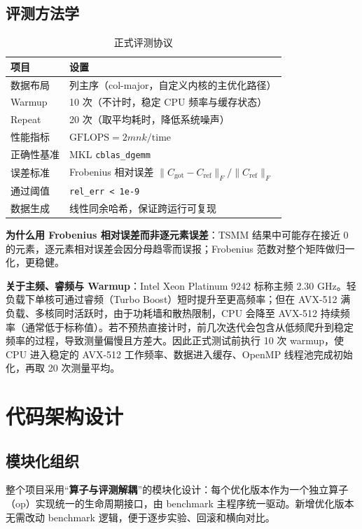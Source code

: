 \documentclass[11pt,a4paper,fontset=fandol]{ctexart}
\begin{document}
\subsection{评测方法学}
\begin{table}[H]
\centering
\caption{正式评测协议}
\small
\begin{tabular}{ll}
\toprule
项目 & 设置 \\
\midrule
数据布局 & 列主序（col-major，自定义内核的主优化路径） \\
Warmup & 10 次（不计时，稳定 CPU 频率与缓存状态） \\
Repeat & 20 次（取平均耗时，降低系统噪声） \\
性能指标 & $\mathrm{GFLOPS} = 2mnk / \mathrm{time}$ \\
正确性基准 & MKL \texttt{cblas\_dgemm} \\
误差标准 & Frobenius 相对误差 $\|C_{\text{got}}-C_{\text{ref}}\|_F / \|C_{\text{ref}}\|_F$ \\
通过阈值 & \texttt{rel\_err < 1e-9} \\
数据生成 & 线性同余哈希，保证跨运行可复现 \\
\bottomrule
\end{tabular}
\end{table}

\textbf{为什么用 Frobenius 相对误差而非逐元素误差}：TSMM 结果中可能存在接近 0 的元素，逐元素相对误差会因分母趋零而误报；Frobenius 范数对整个矩阵做归一化，更稳健。

\textbf{关于主频、睿频与 Warmup}：Intel Xeon Platinum 9242 标称主频 2.30 GHz。轻负载下单核可通过睿频（Turbo Boost）短时提升至更高频率；但在 AVX-512 满负载、多核同时活跃时，由于功耗墙和散热限制，CPU 会降至 AVX-512 持续频率（通常低于标称值）。若不预热直接计时，前几次迭代会包含从低频爬升到稳定频率的过程，导致测量偏慢且方差大。因此正式测试前执行 10 次 warmup，使 CPU 进入稳定的 AVX-512 工作频率、数据进入缓存、OpenMP 线程池完成初始化，再取 20 次测量平均。

\section{代码架构设计}

\subsection{模块化组织}
整个项目采用“\textbf{算子与评测解耦}”的模块化设计：每个优化版本作为一个独立算子（op）实现统一的生命周期接口，由 benchmark 主程序统一驱动。新增优化版本无需改动 benchmark 逻辑，便于逐步实验、回滚和横向对比。
\end{document}
